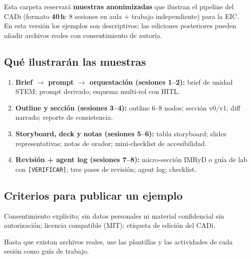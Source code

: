 
Esta carpeta reservará \textbf{muestras anonimizadas} que ilustran el pipeline del CADi (formato \textbf{40\,h}: 8 sesiones en aula + trabajo independiente) para la EIC. En esta versión los ejemplos son descriptivos; las ediciones posteriores pueden añadir archivos reales con consentimiento de autoría.

\subsection*{Qué ilustrarán las muestras}
\begin{enumerate}
\item \textbf{Brief $\rightarrow$ prompt $\rightarrow$ orquestación (sesiones 1--2):} brief de unidad STEM; prompt derivado; esquema multi-rol con HITL.
\item \textbf{Outline y sección (sesiones 3--4):} outline 6--8 nodos; sección v0/v1; diff narrado; reporte de consistencia.
\item \textbf{Storyboard, deck y notas (sesiones 5--6):} tabla storyboard; slides representativas; notas de orador; mini-checklist de accesibilidad.
\item \textbf{Revisión + agent log (sesiones 7--8):} micro-sección IMRyD o guía de lab con \texttt{[VERIFICAR]}; tres pases de revisión; agent log; checklist.
\end{enumerate}

\subsection*{Criterios para publicar un ejemplo}
Consentimiento explícito; sin datos personales ni material confidencial sin autorización; licencia compatible (MIT); etiqueta de edición del CADi.

Hasta que existan archivos reales, use las plantillas y las actividades de cada sesión como guía de trabajo.
